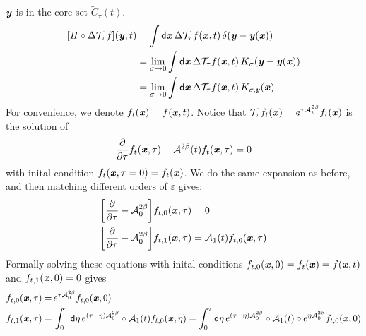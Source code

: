 \documentclass[aip,jcp,a4paper,reprint,onecolumn]{revtex4-1}
\newcommand{\vect}[1]{\textbf{\textit{#1}}}
\newcommand{\dd}{\textsf{d}}
\newcommand{\mt}{\mathcal T}
\newcommand{\proj}{\mathit\Pi}
\newcommand{\fwg}{{\mathcal A}}
\begin{document}
$\vect y$ is in the core set $\widetilde C_\tau(t) $.
\begin{align}\nonumber
  [\proj\circ\Delta \mt_\tau f](\vect y, t)
  &=
  \int
  \dd \vect x\,
  \Delta \mt_\tau f(\vect x, t) \,
  \delta (\vect y - \vect y(\vect x))  \\\nonumber
  &=
  \lim_{\sigma \rightarrow 0}
  \int
  \dd \vect x\,
  \Delta \mt_\tau f(\vect x, t) \,
  K_{\sigma} (\vect y - \vect y(\vect x))  \\\label{eqn:core-identify}
  &=
  \lim_{\sigma \rightarrow 0}
  \int
  \dd \vect x\,
  \Delta \mt_\tau f(\vect x, t) \,
  K_{\sigma, \vect y} (\vect x)
\end{align}
For convenience, we denote $f_t(\vect x) = f(\vect x, t)$.
Notice that $\mt_\tau f_t(\vect x) = e^{\tau \fwg_t^{2\beta}} f_t(\vect x)$
is the solution of
\begin{align}
  \frac{\partial}{\partial \tau} f_t(\vect x, \tau)
  -
  \fwg^{2\beta}(t)  f_t(\vect x, \tau)
  =0
\end{align}
with inital condition $f_t(\vect x, \tau = 0) = f_t(\vect x)$. We do the same
expansion as before, and then
matching different orders of $\varepsilon$ gives:
\begin{align}
  &\bigg[
  \frac{\partial}{\partial \tau}
  - \fwg_0^{2\beta}
  \bigg]
  f_{t,0}(\vect x, \tau)
  = 0 \\
  &\bigg[
  \frac{\partial}{\partial \tau}
  - \fwg_0^{2\beta}
  \bigg]
  f_{t,1}(\vect x, \tau)
  =
  \fwg_1(t) f_{t,0}(\vect x, \tau)
\end{align}
Formally solving these equations with
inital conditions $f_{t,0}(\vect x, 0) = f_t(\vect x) = f(\vect x, t)$
and  $f_{t,1}(\vect x, 0) = 0$ 
gives
\begin{align}\label{eqn:f0-1}
  f_{t,0}(\vect x, \tau)
  =&\,
  e^{\tau\fwg^{2\beta}_0}f_{t,0}(\vect x, 0) \\\label{eqn:f1-1}
  f_{t,1}(\vect x, \tau)
  =&\,
  \int_0^\tau\dd \eta\,
  e^{(\tau-\eta)\fwg^{2\beta}_0}\circ
  \fwg_1(t) f_{t,0}(\vect x,\eta)
  =
  \int_0^\tau\dd \eta\,
  e^{(\tau-\eta)\fwg^{2\beta}_0}\circ
  \fwg_1(t)\circ
  e^{\eta\fwg^{2\beta}_0}f_{t,0}(\vect x, 0) 
\end{align}
\end{document}
